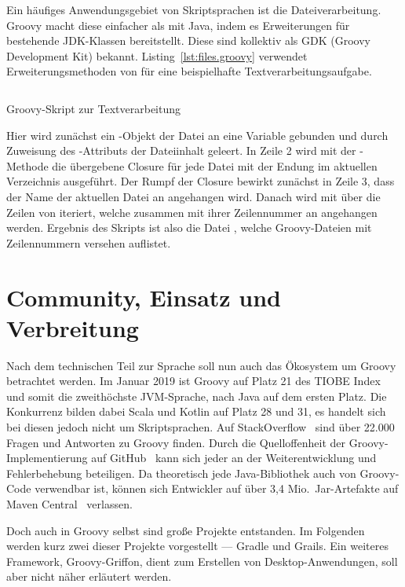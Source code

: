 \documentclass[a4paper]{article}
\newcommand{\codelisting}[3]{\begin{listing}[htp]
	\inputminted{#1}{#1/#2}
	\vspace{-3ex}
	\caption{#3}
	\label{lst:#2}
\end{listing}}
\begin{document}
Ein häufiges Anwendungsgebiet von Skriptsprachen ist die Dateiverarbeitung.
Groovy macht diese einfacher als mit Java, indem es Erweiterungen für bestehende JDK-Klassen bereitstellt.
Diese sind kollektiv als GDK (Groovy Development Kit) bekannt.
Listing~\ref{lst:files.groovy} verwendet Erweiterungsmethoden von  für eine beispielhafte Textverarbeitungsaufgabe.

\codelisting{groovy}{files.groovy}{Groovy-Skript zur Textverarbeitung}

Hier wird zunächst ein -Objekt der Datei  an eine Variable gebunden und durch Zuweisung des -Attributs der Dateiinhalt geleert.
In Zeile 2 wird mit der -Methode die übergebene Closure für jede Datei mit der Endung  im aktuellen Verzeichnis ausgeführt.
Der Rumpf der Closure bewirkt zunächst in Zeile 3, dass der Name der aktuellen Datei  an  angehangen wird.
Danach wird mit  über die Zeilen von  iteriert, welche zusammen mit ihrer Zeilennummer an  angehangen werden.
Ergebnis des Skripts ist also die Datei , welche Groovy-Dateien mit Zeilennummern versehen auflistet.


\section{Community, Einsatz und Verbreitung}\label{sec:community}

Nach dem technischen Teil zur Sprache soll nun auch das Ökosystem um Groovy betrachtet werden.
Im Januar 2019 ist Groovy auf Platz 21 des TIOBE Index~\cite{tiobe-index} und somit die zweithöchste JVM-Sprache, nach Java auf dem ersten Platz.
Die Konkurrenz bilden dabei Scala und Kotlin auf Platz 28 und 31, es handelt sich bei diesen jedoch nicht um Skriptsprachen.
Auf StackOverflow~\cite{stackoverflow:groovy} sind über 22.000 Fragen und Antworten zu Groovy finden.
Durch die Quelloffenheit der Groovy-Implementierung auf GitHub~\cite{github:groovy} kann sich jeder an der Weiterentwicklung und Fehlerbehebung beteiligen.
Da theoretisch jede Java-Bibliothek auch von Groovy-Code verwendbar ist, können sich Entwickler auf über 3,4 Mio.~Jar-Artefakte auf Maven Central~\cite{maven-central} verlassen.

Doch auch in Groovy selbst sind große Projekte entstanden.
Im Folgenden werden kurz zwei dieser Projekte vorgestellt --- Gradle und Grails.
Ein weiteres Framework, Groovy-Griffon, dient zum Erstellen von Desktop-Anwendungen, soll aber nicht näher erläutert werden.
\end{document}
